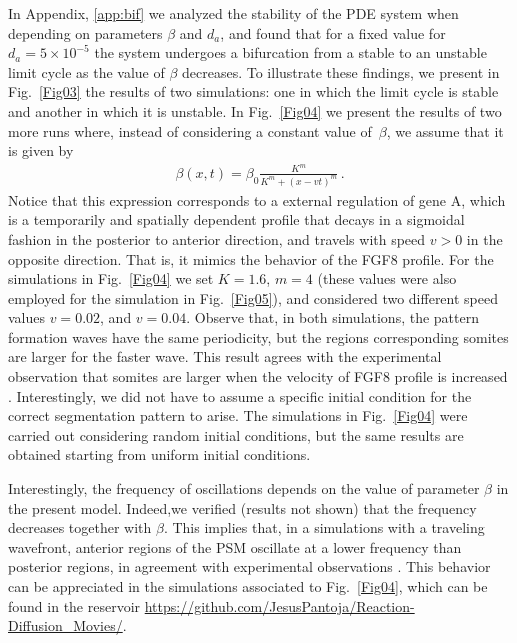 \documentclass[%
 preprint,
 amsmath,amssymb,
 aps,
]{revtex4-2}
\begin{document}
	In Appendix, \ref{app:bif} we analyzed the stability of the PDE system when 
	depending on parameters $\beta$ and $d_a$, and found that for a fixed value 
	for $d_a=5\times10^{-5}$ the system undergoes a bifurcation	from a stable to 
	an unstable limit cycle as the value of $\beta$ decreases. To illustrate these 
	findings, we present in Fig.~\ref{Fig03} the results of two
	simulations: one in which the limit cycle is stable and another in which it is
	unstable. In Fig.~\ref{Fig04} we present the results of two more runs where,
	instead of considering a constant value of~$\beta$, we assume that it is given
	by 
	\begin{gather}\label{eqbeta}
	\beta(x, t) = \beta_0 \frac{K^m}{K^m + (x - v t)^m}\,.
	\end{gather}
	Notice that this expression corresponds to a external regulation of gene A, which 
	is a temporarily and spatially dependent profile that decays in a sigmoidal 
	fashion in the posterior to anterior direction, and travels with speed
	$v>0$ in the opposite direction. That is, it mimics the behavior of the FGF8
	profile. For the simulations in Fig.~\ref{Fig04} we set $K =1.6 $, $m = 4 $
	(these values were also employed for the simulation in Fig.~\ref{Fig05}), and
	considered two different speed values $v = 0.02 $, and $v = 0.04$. Observe that, in
	both simulations, the pattern formation waves have the same periodicity, but the
	regions corresponding somites are larger for the faster wave. This result agrees
	with the experimental observation that somites are	larger when the velocity of 
	FGF8 profile is increased \citep{Sawada2001}. Interestingly, we did not have to 
	assume a specific initial condition for the correct segmentation pattern to arise.
	The simulations in Fig.~\ref{Fig04} were carried out considering random initial 
	conditions, but the same results are obtained starting from uniform initial 
	conditions. 
	
	Interestingly, the frequency of oscillations depends on the value of parameter 
	$\beta$ in the present model. Indeed,we verified (results not shown) that 
	the frequency decreases together with $\beta$. This implies that, in a simulations 
	with a traveling wavefront, anterior regions of the PSM oscillate at a lower 
	frequency than posterior regions, in agreement with experimental observations 
	\citep{Goldbeter2008, Hester2011}. This behavior can be appreciated in the 
	simulations associated to Fig.~\ref{Fig04}, which can be found in the reservoir 
	\url{https://github.com/JesusPantoja/Reaction-Diffusion_Movies/}.
	
\end{document}
